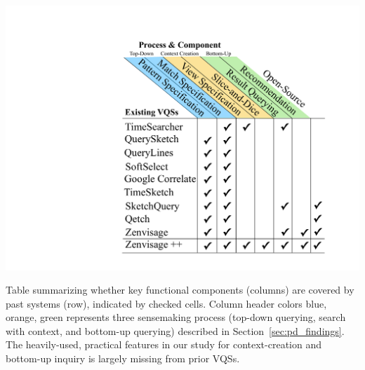{  %
  \begin{table}[ht!]
    \vspace*{-10pt}
     \centering
     \includegraphics[width=0.8\linewidth]{figures/related_works_table.pdf}
     \caption{Table summarizing whether key functional components (columns) are covered by past systems (row), indicated by checked cells. Column header colors blue, orange, green represents three sensemaking process (top-down querying, search with context, and bottom-up querying) described in Section~\ref{sec:pd_findings}. The heavily-used, practical features in our study for context-creation and bottom-up inquiry is largely missing from prior VQSs.}
     \label{table:relatedwork}
     \vspace*{-10pt}
  \end{table}
  \par {}
}
